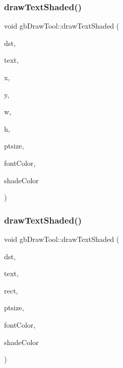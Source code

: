 \subsubsection{\texorpdfstring{drawTextShaded()}{drawTextShaded()}\hspace{0.1cm}{\footnotesize\ttfamily [1/2]}}
{\footnotesize\ttfamily void gb\+Draw\+Tool\+::draw\+Text\+Shaded (\begin{DoxyParamCaption}\item[{S\+D\+L\+\_\+\+Texture $\ast$}]{dst,  }\item[{string}]{text,  }\item[{int}]{x,  }\item[{int}]{y,  }\item[{int}]{w,  }\item[{int}]{h,  }\item[{int}]{ptsize,  }\item[{\mbox{\hyperlink{classgb_color}{gb\+Color}}}]{font\+Color,  }\item[{\mbox{\hyperlink{classgb_color}{gb\+Color}}}]{shade\+Color }\end{DoxyParamCaption})}

\mbox{\label{classgb_draw_tool_a44ea1eb3cba4d6c52f6b26d83e08c6f7}} 
\subsubsection{\texorpdfstring{drawTextShaded()}{drawTextShaded()}\hspace{0.1cm}{\footnotesize\ttfamily [2/2]}}
{\footnotesize\ttfamily void gb\+Draw\+Tool\+::draw\+Text\+Shaded (\begin{DoxyParamCaption}\item[{S\+D\+L\+\_\+\+Texture $\ast$}]{dst,  }\item[{string}]{text,  }\item[{\mbox{\hyperlink{classgb_rect}{gb\+Rect}}}]{rect,  }\item[{int}]{ptsize,  }\item[{\mbox{\hyperlink{classgb_color}{gb\+Color}}}]{font\+Color,  }\item[{\mbox{\hyperlink{classgb_color}{gb\+Color}}}]{shade\+Color }\end{DoxyParamCaption})}

\mbox{\label{classgb_draw_tool_a37df98d144867688ab337b30ab409846}} 
